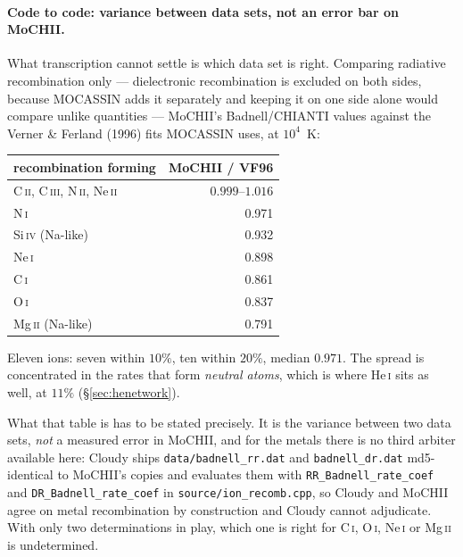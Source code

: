 \documentclass[english,a4paper]{my_memo}
\newcommand{\code}[1]{\texttt{#1}}
\begin{document}
\paragraph{Code to code: variance between data sets, not an error bar on
MoCHII.}  What transcription cannot settle is which data set is right.
Comparing radiative recombination only --- dielectronic recombination is
excluded on both sides, because MOCASSIN adds it separately and keeping it on
one side alone would compare unlike quantities --- MoCHII's Badnell/CHIANTI
values against the Verner \& Ferland (1996) fits MOCASSIN uses, at $10^4$~K:
\begin{center}\small
\begin{tabular}{@{}lr@{}}
\toprule
recombination forming & MoCHII / VF96 \\
\midrule
C\,\textsc{ii}, C\,\textsc{iii}, N\,\textsc{ii}, Ne\,\textsc{ii}
  & $0.999$--$1.016$ \\
N\,\textsc{i}                   & 0.971 \\
Si\,\textsc{iv} (Na-like)       & 0.932 \\
Ne\,\textsc{i}                  & 0.898 \\
C\,\textsc{i}                   & 0.861 \\
O\,\textsc{i}                   & 0.837 \\
Mg\,\textsc{ii} (Na-like)       & 0.791 \\
\bottomrule
\end{tabular}
\end{center}
Eleven ions: seven within $10\%$, ten within $20\%$, median $0.971$.  The
spread is concentrated in the rates that form \emph{neutral atoms}, which is
where He\,\textsc{i} sits as well, at $11\%$ (\S\ref{sec:henetwork}).

What that table is has to be stated precisely.  It is the variance between two
data sets, \emph{not} a measured error in MoCHII, and for the metals there is
no third arbiter available here: Cloudy ships \code{data/badnell\_rr.dat} and
\code{badnell\_dr.dat} md5-identical to MoCHII's copies and evaluates them with
\code{RR\_Badnell\_rate\_coef} and \code{DR\_Badnell\_rate\_coef} in
\code{source/ion\_recomb.cpp}, so Cloudy and MoCHII agree on metal
recombination by construction and Cloudy cannot adjudicate.  With only two
determinations in play, which one is right for C\,\textsc{i}, O\,\textsc{i},
Ne\,\textsc{i} or Mg\,\textsc{ii} is undetermined.
\end{document}
